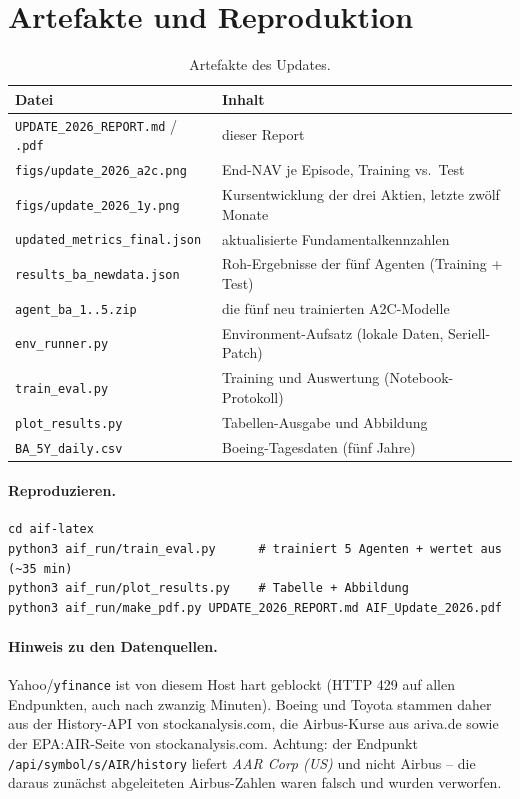 \section{Artefakte und Reproduktion}

\begin{table}[H]
  \centering
  \caption{Artefakte des Updates.}
  \label{tab:artefakte}
  \begin{tabular}{ll}
    \toprule
    Datei & Inhalt\\
    \midrule
    \texttt{UPDATE\_2026\_REPORT.md} / \texttt{.pdf} & dieser Report\\
    \texttt{figs/update\_2026\_a2c.png}  & End-NAV je Episode, Training vs.\ Test\\
    \texttt{figs/update\_2026\_1y.png}   & Kursentwicklung der drei Aktien, letzte zwölf Monate\\
    \texttt{updated\_metrics\_final.json} & aktualisierte Fundamentalkennzahlen\\
    \texttt{results\_ba\_newdata.json}   & Roh-Ergebnisse der fünf Agenten (Training + Test)\\
    \texttt{agent\_ba\_1..5.zip}         & die fünf neu trainierten A2C-Modelle\\
    \texttt{env\_runner.py}              & Environment-Aufsatz (lokale Daten, Seriell-Patch)\\
    \texttt{train\_eval.py}              & Training und Auswertung (Notebook-Protokoll)\\
    \texttt{plot\_results.py}            & Tabellen-Ausgabe und Abbildung\\
    \texttt{BA\_5Y\_daily.csv}           & Boeing-Tagesdaten (fünf Jahre)\\
    \bottomrule
  \end{tabular}
\end{table}

\paragraph{Reproduzieren.}
{\footnotesize
\begin{verbatim}
cd aif-latex
python3 aif_run/train_eval.py      # trainiert 5 Agenten + wertet aus (~35 min)
python3 aif_run/plot_results.py    # Tabelle + Abbildung
python3 aif_run/make_pdf.py UPDATE_2026_REPORT.md AIF_Update_2026.pdf
\end{verbatim}
}

\paragraph{Hinweis zu den Datenquellen.} Yahoo/\texttt{yfinance} ist von diesem Host hart
geblockt (HTTP 429 auf allen Endpunkten, auch nach zwanzig Minuten). Boeing und Toyota
stammen daher aus der History-API von stockanalysis.com, die Airbus-Kurse aus ariva.de
sowie der EPA:AIR-Seite von stockanalysis.com. Achtung: der Endpunkt
\texttt{/api/symbol/s/AIR/history} liefert \emph{AAR Corp (US)} und nicht Airbus -- die
daraus zunächst abgeleiteten Airbus-Zahlen waren falsch und wurden verworfen.
